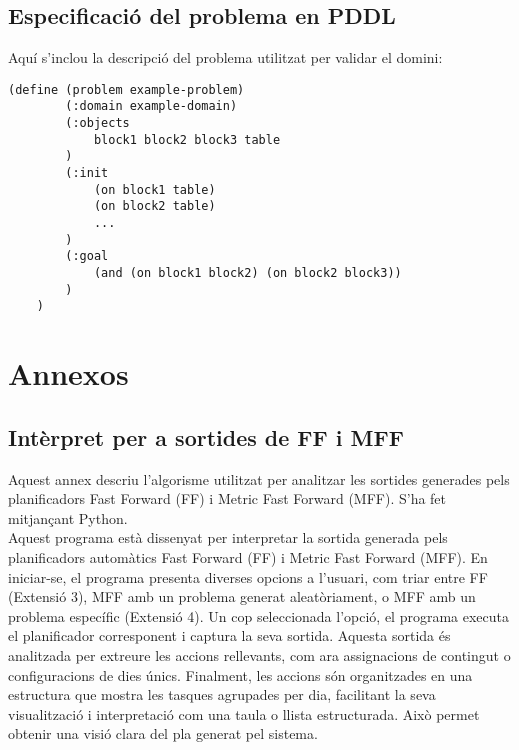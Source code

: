 \documentclass[a4paper]{article}
\begin{document}
	\subsection{Especificació del problema en PDDL}
	Aquí s'inclou la descripció del problema utilitzat per validar el domini:
	
	\begin{lstlisting}[language=PDDL, caption={Especificació del problema en PDDL}, label={lst:problemaPDDL}]
	(define (problem example-problem)
		(:domain example-domain)
		(:objects
			block1 block2 block3 table
		)
		(:init
			(on block1 table)
			(on block2 table)
			...
		)
		(:goal
			(and (on block1 block2) (on block2 block3))
		)
	)
	\end{lstlisting}
	
	\newpage
	\section{Annexos}
	
	\subsection{Intèrpret per a sortides de FF i MFF}
	
	Aquest annex descriu l'algorisme utilitzat per analitzar les sortides generades pels planificadors Fast Forward (FF) i Metric Fast Forward (MFF). S'ha fet mitjançant Python. \\
	
	Aquest programa està dissenyat per interpretar la sortida generada pels planificadors automàtics Fast Forward (FF) i Metric Fast Forward (MFF). En iniciar-se, el programa presenta diverses opcions a l'usuari, com triar entre FF (Extensió 3), MFF amb un problema generat aleatòriament, o MFF amb un problema específic (Extensió 4). Un cop seleccionada l'opció, el programa executa el planificador corresponent i captura la seva sortida. Aquesta sortida és analitzada per extreure les accions rellevants, com ara assignacions de contingut o configuracions de dies únics. Finalment, les accions són organitzades en una estructura que mostra les tasques agrupades per dia, facilitant la seva visualització i interpretació com una taula o llista estructurada. Això permet obtenir una visió clara del pla generat pel sistema.
	
\end{document}
